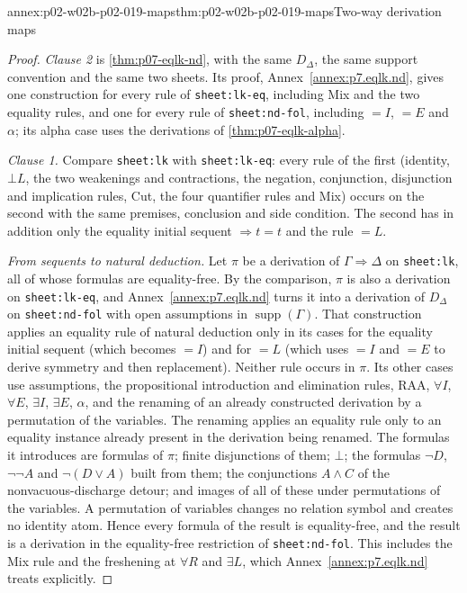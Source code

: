 \begin{annexitem}{annex:p02-w02b-p02-019-maps}{thm:p02-w02b-p02-019-maps}{Two-way derivation maps}
\begin{proof}
\emph{Clause 2} is \cref{thm:p07-eqlk-nd}, with the same \(D_{\Delta}\), the
same support convention and the same two sheets.  Its proof,
Annex~\ref{annex:p7.eqlk.nd}, gives one construction for every rule of
\texttt{sheet:lk-eq}, including Mix and the two equality rules, and one for
every rule of \texttt{sheet:nd-fol}, including \(=I\), \(=E\) and
\(\alpha\); its alpha case uses the derivations of
\cref{thm:p07-eqlk-alpha}.

\emph{Clause 1.}  Compare \texttt{sheet:lk} with \texttt{sheet:lk-eq}: every
rule of the first (identity, \(\bot L\), the two weakenings and contractions,
the negation, conjunction, disjunction and implication rules, Cut, the four
quantifier rules and Mix) occurs on the second with the same premises,
conclusion and side condition.  The second has in addition only the
equality initial sequent \(\Rightarrow t=t\) and the rule \(=L\).

\emph{From sequents to natural deduction.}  Let \(\pi\) be a derivation of
\(\Gamma\Rightarrow\Delta\) on \texttt{sheet:lk}, all of whose formulas are
equality-free.  By the comparison, \(\pi\) is also a derivation on
\texttt{sheet:lk-eq}, and Annex~\ref{annex:p7.eqlk.nd} turns it into a
derivation of \(D_{\Delta}\) on \texttt{sheet:nd-fol} with open assumptions
in \(\operatorname{supp}(\Gamma)\).  That construction applies an equality
rule of natural deduction only in its cases for the equality initial sequent
(which becomes \(=I\)) and for \(=L\) (which uses \(=I\) and \(=E\) to derive
symmetry and then replacement).  Neither rule occurs in \(\pi\).  Its other
cases use assumptions, the propositional introduction and elimination rules,
RAA, \(\forall I\), \(\forall E\), \(\exists I\), \(\exists E\), \(\alpha\),
and the renaming of an already constructed derivation by a permutation of
the variables.  The renaming applies an equality rule only to an equality
instance already present in the derivation being renamed.  The formulas it
introduces are formulas of \(\pi\); finite disjunctions of them; \(\bot\);
the formulas \(\neg D\), \(\neg\neg A\) and \(\neg(D\lor A)\) built from
them; the conjunctions \(A\land C\) of the nonvacuous-discharge detour; and
images of all of these under permutations of the variables.  A permutation
of variables changes no relation symbol and creates no identity atom.  Hence
every formula of the result is equality-free, and the result is a derivation
in the equality-free restriction of \texttt{sheet:nd-fol}.  This includes
the Mix rule and the freshening at \(\forall R\) and \(\exists L\), which
Annex~\ref{annex:p7.eqlk.nd} treats explicitly.


\end{proof}
\end{annexitem}
